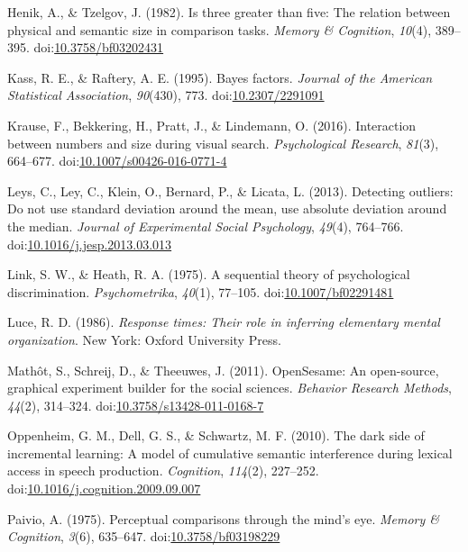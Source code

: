 \documentclass[english,man]{apa6}
\theoremstyle{definition}
\theoremstyle{definition}
\theoremstyle{definition}
\theoremstyle{remark}
\begin{document}
\hypertarget{ref-henik1982}{}
Henik, A., \& Tzelgov, J. (1982). Is three greater than five: The
relation between physical and semantic size in comparison tasks.
\emph{Memory \& Cognition}, \emph{10}(4), 389--395.
doi:\href{https://doi.org/10.3758/bf03202431}{10.3758/bf03202431}

\hypertarget{ref-kass1995}{}
Kass, R. E., \& Raftery, A. E. (1995). Bayes factors. \emph{Journal of
the American Statistical Association}, \emph{90}(430), 773.
doi:\href{https://doi.org/10.2307/2291091}{10.2307/2291091}

\hypertarget{ref-krause2016}{}
Krause, F., Bekkering, H., Pratt, J., \& Lindemann, O. (2016).
Interaction between numbers and size during visual search.
\emph{Psychological Research}, \emph{81}(3), 664--677.
doi:\href{https://doi.org/10.1007/s00426-016-0771-4}{10.1007/s00426-016-0771-4}

\hypertarget{ref-leys2013}{}
Leys, C., Ley, C., Klein, O., Bernard, P., \& Licata, L. (2013).
Detecting outliers: Do not use standard deviation around the mean, use
absolute deviation around the median. \emph{Journal of Experimental
Social Psychology}, \emph{49}(4), 764--766.
doi:\href{https://doi.org/10.1016/j.jesp.2013.03.013}{10.1016/j.jesp.2013.03.013}

\hypertarget{ref-link1975}{}
Link, S. W., \& Heath, R. A. (1975). A sequential theory of
psychological discrimination. \emph{Psychometrika}, \emph{40}(1),
77--105.
doi:\href{https://doi.org/10.1007/bf02291481}{10.1007/bf02291481}

\hypertarget{ref-luce1986}{}
Luce, R. D. (1986). \emph{Response times: Their role in inferring
elementary mental organization}. New York: Oxford University Press.

\hypertarget{ref-opensesame}{}
Mathôt, S., Schreij, D., \& Theeuwes, J. (2011). OpenSesame: An
open-source, graphical experiment builder for the social sciences.
\emph{Behavior Research Methods}, \emph{44}(2), 314--324.
doi:\href{https://doi.org/10.3758/s13428-011-0168-7}{10.3758/s13428-011-0168-7}

\hypertarget{ref-oppenheim2010}{}
Oppenheim, G. M., Dell, G. S., \& Schwartz, M. F. (2010). The dark side
of incremental learning: A model of cumulative semantic interference
during lexical access in speech production. \emph{Cognition},
\emph{114}(2), 227--252.
doi:\href{https://doi.org/10.1016/j.cognition.2009.09.007}{10.1016/j.cognition.2009.09.007}

\hypertarget{ref-pavio1975}{}
Paivio, A. (1975). Perceptual comparisons through the mind's eye.
\emph{Memory \& Cognition}, \emph{3}(6), 635--647.
doi:\href{https://doi.org/10.3758/bf03198229}{10.3758/bf03198229}
\end{document}
